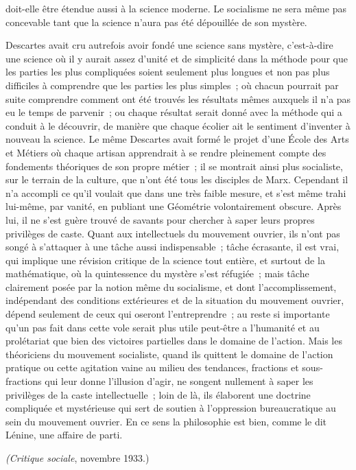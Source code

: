 \documentclass[french,twoside]{book} %
\begin{document}
doit-elle être étendue aussi à la science moderne. Le socialisme ne sera même pas concevable tant que la science n'aura pas été dépouillée de son mystère.\par
Descartes avait cru autrefois avoir fondé une science sans mystère, c'est-à-dire une science où il y aurait assez d'unité et de simplicité dans la méthode pour que les parties les plus compliquées soient seulement plus longues et non pas plus difficiles à comprendre que les parties les plus simples ; où chacun pourrait par suite comprendre comment ont été trouvés les résultats mêmes auxquels il n'a pas eu le temps de parvenir ; ou chaque résultat serait donné avec la méthode qui a conduit à le découvrir, de manière que chaque écolier ait le sentiment d'inventer à nouveau la science. Le même Descartes avait formé le projet d'une École des Arts et Métiers où chaque artisan apprendrait à se rendre pleinement compte des fondements théoriques de son propre métier ; il se montrait ainsi plus socialiste, sur le terrain de la culture, que n'ont été tous les disciples de Marx. Cependant il n'a accompli ce qu'il voulait que dans une très faible mesure, et s'est même trahi lui-même, par vanité, en publiant une Géométrie volontairement obscure. Après lui, il ne s'est guère trouvé de savants pour chercher à saper leurs propres privilèges de caste. Quant aux intellectuels du mouvement ouvrier, ils n'ont pas songé à s'attaquer à une tâche aussi indispensable ; tâche écrasante, il est vrai, qui implique une révision critique de la science tout entière, et surtout de la mathématique, où la quintessence du mystère s'est réfugiée ; mais tâche clairement posée par la notion même du socialisme, et dont l'accomplissement, indépendant des conditions extérieures et de la situation du mouvement ouvrier, dépend seulement de ceux qui oseront l'entreprendre ; au reste si importante qu'un pas fait dans cette vole serait plus utile peut-être a l'humanité et au prolétariat que bien des victoires partielles dans le domaine de l'action. Mais les théoriciens du mouvement socialiste, quand ils quittent le domaine de l'action pratique ou cette agitation vaine au milieu des tendances, fractions et sous-fractions qui leur donne l'illusion d'agir, ne songent nullement à saper les privilèges de la caste intellectuelle ; loin de là, ils élaborent une doctrine compliquée et mystérieuse qui sert de soutien à l'oppression bureaucratique au sein du mouvement ouvrier. En ce sens la philosophie est bien, comme le dit Lénine, une affaire de parti.\par
{\itshape (Critique sociale}, novembre 1933.)\par
\end{document}
